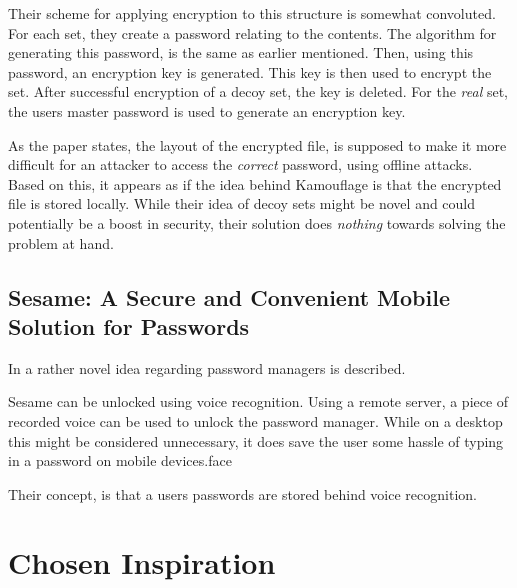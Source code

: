 			Their scheme for applying encryption to this structure is somewhat convoluted. For each set, they create a password relating to the contents. The algorithm for generating this password, is the same as earlier mentioned. Then, using this password, an encryption key is generated. This key is then used to encrypt the set. After successful encryption of a decoy set, the key is deleted. For the \emph{real} set, the users master password is used to generate an encryption key.

			As the paper states, the layout of the encrypted file, is supposed to make it more difficult for an attacker to access the \emph{correct} password, using offline attacks. Based on this, it appears as if the idea behind Kamouflage is that the encrypted file is stored locally. While their idea of decoy sets might be novel and could potentially be a boost in security, their solution does \emph{nothing} towards solving the problem at hand.


		\subsection*{Sesame: A Secure and Convenient Mobile Solution for Passwords}
			In \cite{sesame} a rather novel idea regarding password managers is described.


			Sesame can be unlocked using voice recognition. Using a remote server, a piece of recorded voice can be used to unlock the password manager. While on a desktop this might be considered unnecessary, it does save the user some hassle of typing in a password on mobile devices.face


			Their concept, is that a users passwords are stored behind voice recognition.




	\section{Chosen Inspiration} 